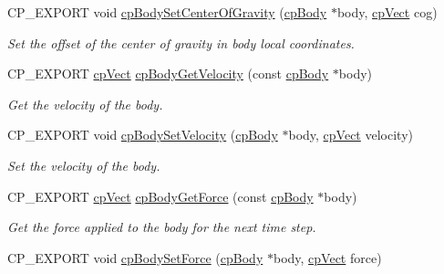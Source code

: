 \begin{DoxyCompactItemize}
\mbox{\label{group__cpBody_ga85057b92d52ce18f6442c82d6fbb4f2c}} 
C\+P\+\_\+\+E\+X\+P\+O\+RT void \hyperlink{group__cpBody_ga85057b92d52ce18f6442c82d6fbb4f2c}{cp\+Body\+Set\+Center\+Of\+Gravity} (\hyperlink{structcpBody}{cp\+Body} $\ast$body, \hyperlink{structcpVect}{cp\+Vect} cog)
\begin{DoxyCompactList}\small\item\em Set the offset of the center of gravity in body local coordinates. \end{DoxyCompactList}\item 
\mbox{\label{group__cpBody_gad7b8c4ed9d76d9eb139e925d5f1c09e5}} 
C\+P\+\_\+\+E\+X\+P\+O\+RT \hyperlink{structcpVect}{cp\+Vect} \hyperlink{group__cpBody_gad7b8c4ed9d76d9eb139e925d5f1c09e5}{cp\+Body\+Get\+Velocity} (const \hyperlink{structcpBody}{cp\+Body} $\ast$body)
\begin{DoxyCompactList}\small\item\em Get the velocity of the body. \end{DoxyCompactList}\item 
\mbox{\label{group__cpBody_gacf91e39f46b062dba71d750f806aa60c}} 
C\+P\+\_\+\+E\+X\+P\+O\+RT void \hyperlink{group__cpBody_gacf91e39f46b062dba71d750f806aa60c}{cp\+Body\+Set\+Velocity} (\hyperlink{structcpBody}{cp\+Body} $\ast$body, \hyperlink{structcpVect}{cp\+Vect} velocity)
\begin{DoxyCompactList}\small\item\em Set the velocity of the body. \end{DoxyCompactList}\item 
\mbox{\label{group__cpBody_ga8be8f23f2dd41bf20a23b41e87232f46}} 
C\+P\+\_\+\+E\+X\+P\+O\+RT \hyperlink{structcpVect}{cp\+Vect} \hyperlink{group__cpBody_ga8be8f23f2dd41bf20a23b41e87232f46}{cp\+Body\+Get\+Force} (const \hyperlink{structcpBody}{cp\+Body} $\ast$body)
\begin{DoxyCompactList}\small\item\em Get the force applied to the body for the next time step. \end{DoxyCompactList}\item 
\mbox{\label{group__cpBody_ga475392f72dee32071e0248c492afc342}} 
C\+P\+\_\+\+E\+X\+P\+O\+RT void \hyperlink{group__cpBody_ga475392f72dee32071e0248c492afc342}{cp\+Body\+Set\+Force} (\hyperlink{structcpBody}{cp\+Body} $\ast$body, \hyperlink{structcpVect}{cp\+Vect} force)

\end{DoxyCompactItemize}
